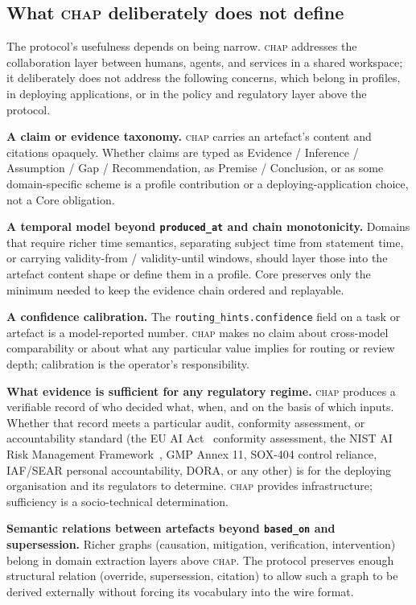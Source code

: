 \documentclass[11pt]{article}
\newcommand{\chap}{\textsc{chap}}
\begin{document}
\subsection{What \chap{} deliberately does not define}
\label{sec:non-goals}

The protocol's usefulness depends on being narrow. \chap{} addresses the collaboration layer between humans, agents, and services in a shared workspace; it deliberately does not address the following concerns, which belong in profiles, in deploying applications, or in the policy and regulatory layer above the protocol.

\begin{description}[leftmargin=!,labelwidth=1.2cm]
    \item[N1] \textbf{A claim or evidence taxonomy.} \chap{} carries an artefact's content and citations opaquely. Whether claims are typed as Evidence / Inference / Assumption / Gap / Recommendation, as Premise / Conclusion, or as some domain-specific scheme is a profile contribution or a deploying-application choice, not a Core obligation.

    \item[N2] \textbf{A temporal model beyond \texttt{produced\_at} and chain monotonicity.} Domains that require richer time semantics, separating subject time from statement time, or carrying validity-from / validity-until windows, should layer those into the artefact content shape or define them in a profile. Core preserves only the minimum needed to keep the evidence chain ordered and replayable.

    \item[N3] \textbf{A confidence calibration.} The \texttt{routing\_hints.confidence} field on a task or artefact is a model-reported number. \chap{} makes no claim about cross-model comparability or about what any particular value implies for routing or review depth; calibration is the operator's responsibility.

    \item[N4] \textbf{What evidence is sufficient for any regulatory regime.} \chap{} produces a verifiable record of who decided what, when, and on the basis of which inputs. Whether that record meets a particular audit, conformity assessment, or accountability standard (the EU AI Act~\cite{euai} conformity assessment, the NIST AI Risk Management Framework~\cite{nistairmf}, GMP Annex 11, SOX-404 control reliance, IAF/SEAR personal accountability, DORA, or any other) is for the deploying organisation and its regulators to determine. \chap{} provides infrastructure; sufficiency is a socio-technical determination.

    \item[N5] \textbf{Semantic relations between artefacts beyond \texttt{based\_on} and supersession.} Richer graphs (causation, mitigation, verification, intervention) belong in domain extraction layers above \chap{}. The protocol preserves enough structural relation (override, supersession, citation) to allow such a graph to be derived externally without forcing its vocabulary into the wire format.
\end{description}
\end{document}
